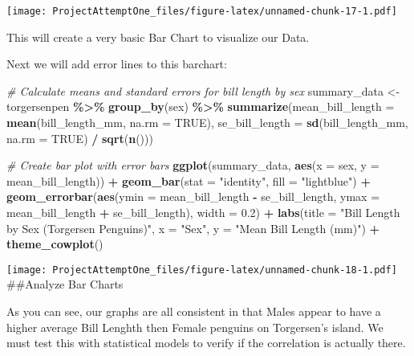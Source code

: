 \documentclass[
]{article}
\newenvironment{Shaded}{\begin{snugshade}}{\end{snugshade}}
\newcommand{\AttributeTok}[1]{\textcolor[rgb]{0.13,0.29,0.53}{#1}}
\newcommand{\CommentTok}[1]{\textcolor[rgb]{0.56,0.35,0.01}{\textit{#1}}}
\newcommand{\ConstantTok}[1]{\textcolor[rgb]{0.56,0.35,0.01}{#1}}
\newcommand{\FloatTok}[1]{\textcolor[rgb]{0.00,0.00,0.81}{#1}}
\newcommand{\FunctionTok}[1]{\textcolor[rgb]{0.13,0.29,0.53}{\textbf{#1}}}
\newcommand{\NormalTok}[1]{#1}
\newcommand{\OtherTok}[1]{\textcolor[rgb]{0.56,0.35,0.01}{#1}}
\newcommand{\SpecialCharTok}[1]{\textcolor[rgb]{0.81,0.36,0.00}{\textbf{#1}}}
\newcommand{\StringTok}[1]{\textcolor[rgb]{0.31,0.60,0.02}{#1}}
\begin{document}
\texttt{[image: ProjectAttemptOne\_files/figure-latex/unnamed-chunk-17-1.pdf]}

This will create a very basic Bar Chart to visualize our Data.

Next we will add error lines to this barchart:

\begin{Shaded}
\begin{Highlighting}[]
\CommentTok{\# Calculate means and standard errors for bill length by sex}
\NormalTok{summary\_data }\OtherTok{\textless{}{-}}\NormalTok{ torgersenpen }\SpecialCharTok{\%\textgreater{}\%}
  \FunctionTok{group\_by}\NormalTok{(sex) }\SpecialCharTok{\%\textgreater{}\%}
  \FunctionTok{summarize}\NormalTok{(}\AttributeTok{mean\_bill\_length =} \FunctionTok{mean}\NormalTok{(bill\_length\_mm, }\AttributeTok{na.rm =} \ConstantTok{TRUE}\NormalTok{),}
            \AttributeTok{se\_bill\_length =} \FunctionTok{sd}\NormalTok{(bill\_length\_mm, }\AttributeTok{na.rm =} \ConstantTok{TRUE}\NormalTok{) }\SpecialCharTok{/} \FunctionTok{sqrt}\NormalTok{(}\FunctionTok{n}\NormalTok{()))}

\CommentTok{\# Create bar plot with error bars}
\FunctionTok{ggplot}\NormalTok{(summary\_data, }\FunctionTok{aes}\NormalTok{(}\AttributeTok{x =}\NormalTok{ sex, }\AttributeTok{y =}\NormalTok{ mean\_bill\_length)) }\SpecialCharTok{+}
  \FunctionTok{geom\_bar}\NormalTok{(}\AttributeTok{stat =} \StringTok{"identity"}\NormalTok{, }\AttributeTok{fill =} \StringTok{"lightblue"}\NormalTok{) }\SpecialCharTok{+}
  \FunctionTok{geom\_errorbar}\NormalTok{(}\FunctionTok{aes}\NormalTok{(}\AttributeTok{ymin =}\NormalTok{ mean\_bill\_length }\SpecialCharTok{{-}}\NormalTok{ se\_bill\_length,}
                    \AttributeTok{ymax =}\NormalTok{ mean\_bill\_length }\SpecialCharTok{+}\NormalTok{ se\_bill\_length), }
                \AttributeTok{width =} \FloatTok{0.2}\NormalTok{) }\SpecialCharTok{+}
  \FunctionTok{labs}\NormalTok{(}\AttributeTok{title =} \StringTok{"Bill Length by Sex (Torgersen Penguins)"}\NormalTok{,}
       \AttributeTok{x =} \StringTok{"Sex"}\NormalTok{,}
       \AttributeTok{y =} \StringTok{"Mean Bill Length (mm)"}\NormalTok{) }\SpecialCharTok{+}
  \FunctionTok{theme\_cowplot}\NormalTok{()}
\end{Highlighting}
\end{Shaded}

\texttt{[image: ProjectAttemptOne\_files/figure-latex/unnamed-chunk-18-1.pdf]}
\#\#Analyze Bar Charts

As you can see, our graphs are all consistent in that Males appear to
have a higher average Bill Lenghth then Female penguins on Torgersen's
island. We must test this with statistical models to verify if the
correlation is actually there.
\end{document}

